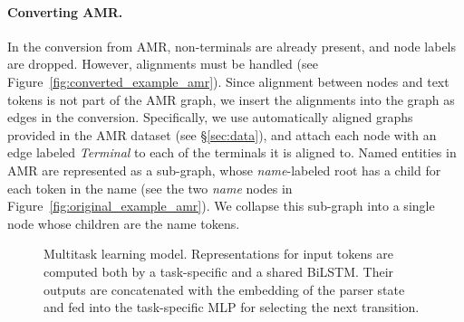 \documentclass[11pt,a4paper]{article}
\begin{document}
\paragraph{Converting AMR.}
In the conversion from AMR, non-terminals are already present, and node labels are dropped.
However, alignments must be handled (see Figure~\ref{fig:converted_example_amr}).
Since alignment between nodes and text tokens is not part of the AMR graph,
we insert the alignments into the graph as edges in the conversion.
Specifically, we use automatically aligned graphs provided in the AMR dataset (see \S\ref{sec:data}),
and attach each node with an edge labeled \textit{Terminal} to each of the terminals it is aligned to.
%
Named entities in AMR are represented as a sub-graph, whose \textit{name}-labeled root
has a child for each token in the name (see the two \textit{name} nodes in Figure~\ref{fig:original_example_amr}).
We collapse this sub-graph into a single node whose children are the name tokens.


\begin{figure}[t]
   \caption{Multitask learning model.
      Representations for input tokens are computed both by a task-specific and a shared BiLSTM.
      Their outputs are concatenated with the embedding of the parser state and fed into the task-specific MLP for selecting the next transition.}
   \label{fig:multi_model}
\end{figure}
\end{document}
